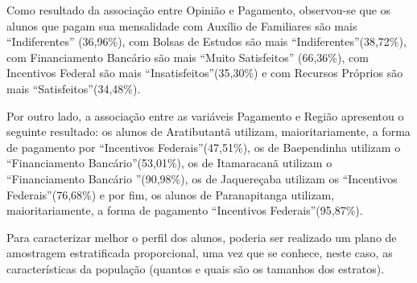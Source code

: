 Como resultado da associação entre Opinião e Pagamento, observou-se que os alunos que pagam sua mensalidade com Auxílio de Familiares são mais \textquotedblleft Indiferentes\textquotedblright 
(36,96\%), com Bolsas de Estudos são mais \textquotedblleft Indiferentes\textquotedblright (38,72\%), com Financiamento Bancário são mais \textquotedblleft Muito Satisfeitos\textquotedblright 
(66,36\%), com Incentivos Federal são mais \textquotedblleft Insatisfeitos\textquotedblright (35,30\%) e com Recursos Próprios são mais \textquotedblleft Satisfeitos\textquotedblright (34,48\%).

Por outro lado, a associação entre as variáveis Pagamento e Região apresentou o seguinte resultado: os alunos de Aratibutantã utilizam, maioritariamente, a forma de pagamento por 
\textquotedblleft Incentivos Federais\textquotedblright (47,51\%), os de Baependinha utilizam o \textquotedblleft Financiamento Bancário\textquotedblright (53,01\%), os de Itamaracanã utilizam o 
\textquotedblleft Financiamento Bancário \textquotedblright (90,98\%), os de Jaquereçaba utilizam os \textquotedblleft Incentivos Federais\textquotedblright (76,68\%) e por fim, os alunos de 
Paranapitanga utilizam, maioritariamente, a forma de pagamento \textquotedblleft Incentivos Federais\textquotedblright (95,87\%). 


Para caracterizar melhor o perfil dos alunos, poderia ser realizado um plano de amostragem estratificada proporcional, uma vez que se conhece, neste caso, as características da população (quantos e 
quais são os tamanhos dos estratos). 
